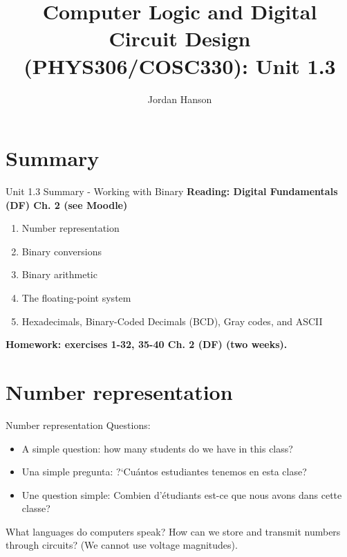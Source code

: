 \documentclass{beamer}
\title{Computer Logic and Digital Circuit Design (PHYS306/COSC330): Unit 1.3}
\author{Jordan Hanson}
\institute{Whittier College Department of Physics and Astronomy}
\begin{document}
\maketitle

\section{Summary}

\begin{frame}{Unit 1.3 Summary - Working with Binary}
\textbf{Reading: Digital Fundamentals (DF) Ch. 2 (see Moodle)}
\begin{enumerate}
\item Number representation
\item Binary conversions
\item Binary arithmetic
\item The floating-point system
\item Hexadecimals, Binary-Coded Decimals (BCD), Gray codes, and ASCII
\end{enumerate}
\textbf{Homework: exercises 1-32, 35-40 Ch. 2 (DF) (two weeks).}
\end{frame}

\section{Number representation}

\begin{frame}{Number representation}
Questions:
\begin{itemize}
\item A simple question: how many students do we have in this class? \\
\item Una simple pregunta: ?`Cu\'{a}ntos estudiantes tenemos en esta clase? \\
\item Une question simple: Combien d'\'{e}tudiants est-ce que nous avons dans cette classe?
\end{itemize}
What languages do computers speak?  How can we store and transmit numbers through circuits?  (We cannot use voltage magnitudes).
\end{frame}
\end{document}

